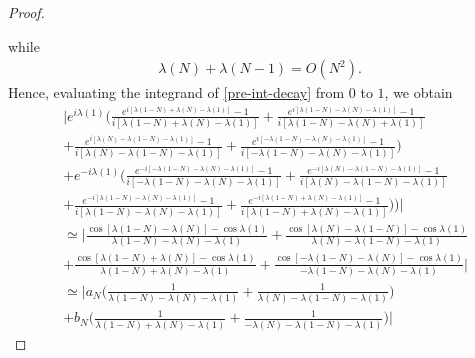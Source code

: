 \documentclass[12pt,reqno]{amsart}
\numberwithin{equation}{section}  %
\begin{document}
\begin{proof}
\begin{framed}
\end{framed}
%
while
%
%
\begin{equation*}
\begin{split}
  \lambda(N) + \lambda(N-1) = O(N^{2}).
\end{split}
\end{equation*}
%
%
Hence, evaluating the integrand of \eqref{pre-int-decay} from $0$ to $1$, we obtain 
%
%
\begin{equation}
  \label{puy}
\begin{split}
  & \Big | e^{i \lambda(1)}\bigg ( \frac{e^{i[\lambda(1-N) + \lambda(N) - \lambda(1)]} - 1}{i[\lambda(1-N) + \lambda(N) - \lambda(1)]} + 
  \frac{e^{i[\lambda(1-N) - \lambda(N) - \lambda(1)]} - 1}{i[\lambda(1-N) - \lambda(N) + \lambda(1)]}  
  \\
  & +  \frac{e^{i[\lambda(N) - \lambda(1-N) - \lambda(1)]} - 1}{i[\lambda(N) - \lambda(1-N) - \lambda(1)]} + \frac{e^{i[-\lambda(1-N) - \lambda(N) - \lambda(1)]} - 1}{i[-\lambda(1-N) - \lambda(N) - \lambda(1)]} \bigg ) 
  \\
  & + e^{-i \lambda(1)}\bigg ( \frac{e^{-i[-\lambda(1-N) - \lambda(N) - \lambda(1)]} - 1}{i[-\lambda(1-N) - \lambda(N) - \lambda(1)]} + 
  \frac{e^{-i[\lambda(N) - \lambda(1-N) - \lambda(1)]} - 1}{i[\lambda(N) - \lambda(1-N) - \lambda(1)]} 
  \\
  & +  \frac{e^{-i[\lambda(1-N) - \lambda(N) - \lambda(1)]} - 1}{i[\lambda(1-N) - \lambda(N) - \lambda(1)]} + \frac{e^{-i[\lambda(1-N) + \lambda(N) - \lambda(1)]} - 1}{i[\lambda(1-N) + \lambda(N) - \lambda(1)]} \bigg ) 
  \bigg )  \bigg |
  \\
  & \simeq \bigg | \frac{\cos[\lambda(1-N) - \lambda(N)] - \cos \lambda(1)}{\lambda(1-N) - \lambda(N) - \lambda(1)} + \frac{\cos[\lambda(N) - \lambda(1-N)] - \cos \lambda(1)}{\lambda(N) - \lambda(1-N) - \lambda(1)} 
  \\
  & + \frac{\cos[\lambda(1-N) + \lambda(N)] - \cos \lambda(1)}{\lambda(1-N) + \lambda(N) - \lambda(1)} + \frac{\cos[-\lambda(1-N) - \lambda(N)] - \cos \lambda(1)}{-\lambda(1-N) - \lambda(N) - \lambda(1)}
  \bigg | 
  \\
  & \simeq \bigg | a_{N} \bigg ( \frac{1}{\lambda(1-N) - \lambda(N) - \lambda(1)} + \frac{1}{\lambda(N) - \lambda(1-N) - \lambda(1)} \bigg )
  \\
  & + b_{N} \bigg ( \frac{1}{\lambda(1-N) + \lambda(N) - \lambda(1)} + \frac{1}{-\lambda(N) - \lambda(1-N) - \lambda(1)} 
  \bigg ) \bigg | 
\end{split}
\end{equation}

\end{proof}
\end{document}
